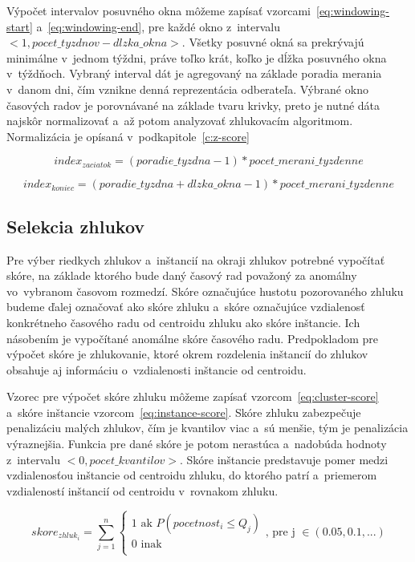 \documentclass[a4paper,twoside,slovak,12pt,appendix]{article}
\begin{document}
Výpočet intervalov posuvného okna môžeme zapísať
vzorcami~\ref{eq:windowing-start} a~\ref{eq:windowing-end}, pre každé okno
z~intervalu $<1, pocet\_tyzdnov - dlzka\_okna>$. Všetky posuvné okná sa
prekrývajú minimálne v~jednom týždni, práve toľko krát, koľko je dĺžka posuvného
okna v~týždňoch. Vybraný interval dát je agregovaný na základe poradia merania
v~danom dni, čím vznikne denná reprezentácia odberateľa. Výbrané okno časových
radov je porovnávané na základe tvaru krivky, preto je nutné dáta najskôr
normalizovať a~až potom analyzovať zhlukovacím algoritmom. Normalizácia je
opísaná v~podkapitole~\ref{c:z-score}

\begin{equation}
  index_{zaciatok} = (poradie\_tyzdna - 1) * pocet\_merani\_tyzdenne
  \label{eq:windowing-start}
\end{equation}

\begin{equation}
  index_{koniec} = (poradie\_tyzdna + dlzka\_okna - 1) * pocet\_merani\_tyzdenne
  \label{eq:windowing-end}
\end{equation}

\subsection{Selekcia zhlukov}
Pre výber riedkych zhlukov a~inštancií na okraji zhlukov potrebné vypočítať
skóre, na základe ktorého bude daný časový rad považoný za anomálny vo~vybranom
časovom rozmedzí. Skóre označujúce hustotu pozorovaného zhluku budeme ďalej
označovať ako skóre zhluku a~skóre označujúce vzdialenosť konkrétneho časového
radu od centroidu zhluku ako skóre inštancie. Ich násobením je vypočítané
anomálne skóre časového radu. Predpokladom pre výpočet skóre je zhlukovanie,
ktoré okrem rozdelenia inštancií do zhlukov obsahuje aj informáciu
o~vzdialenosti inštancie od centroidu.

Vzorec pre výpočet skóre zhluku môžeme zapísať vzorcom~\ref{eq:cluster-score}
a~skóre inštancie vzorcom~\ref{eq:instance-score}. Skóre zhluku zabezpečuje
penalizáciu malých zhlukov, čím je kvantilov viac a~sú menšie, tým je
penalizácia výraznejšia. Funkcia pre dané skóre je potom nerastúca
a~nadobúda hodnoty z~intervalu $<0, pocet\_kvantilov>$. Skóre inštancie
predstavuje pomer medzi vzdialenosťou inštancie od centroidu zhluku, do ktorého
patrí a~priemerom vzdialeností inštancií od centroidu v~rovnakom zhluku.

\begin{equation}
  skore_{zhluk_i} = \sum_{j=1}^{n}
  \begin{cases}
    1 \text{ ak } P(pocetnost_i \leq Q_j) \\
    0 \text{ inak } \\
  \end{cases}
  \text{, pre j } \in (0.05, 0.1, ...)
  \label{eq:cluster-score}
\end{equation}
\end{document}
